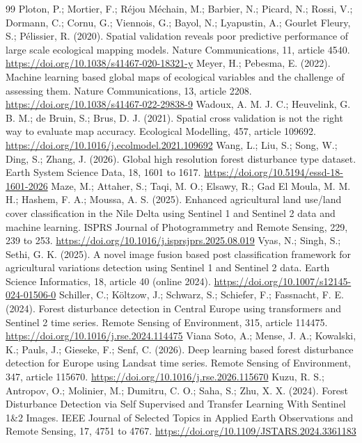 \documentclass[11pt,a4paper]{article}
\begin{document}
\begin{thebibliography}{99}
 Ploton, P.; Mortier, F.; Réjou Méchain, M.; Barbier, N.; Picard, N.; Rossi, V.; Dormann, C.; Cornu, G.; Viennois, G.; Bayol, N.; Lyapustin, A.; Gourlet Fleury, S.; Pélissier, R. (2020). Spatial validation reveals poor predictive performance of large scale ecological mapping models. Nature Communications, 11, article 4540. \url{https://doi.org/10.1038/s41467-020-18321-y}
 Meyer, H.; Pebesma, E. (2022). Machine learning based global maps of ecological variables and the challenge of assessing them. Nature Communications, 13, article 2208. \url{https://doi.org/10.1038/s41467-022-29838-9}
 Wadoux, A. M. J. C.; Heuvelink, G. B. M.; de Bruin, S.; Brus, D. J. (2021). Spatial cross validation is not the right way to evaluate map accuracy. Ecological Modelling, 457, article 109692. \url{https://doi.org/10.1016/j.ecolmodel.2021.109692}
 Wang, L.; Liu, S.; Song, W.; Ding, S.; Zhang, J. (2026). Global high resolution forest disturbance type dataset. Earth System Science Data, 18, 1601 to 1617. \url{https://doi.org/10.5194/essd-18-1601-2026}
 Maze, M.; Attaher, S.; Taqi, M. O.; Elsawy, R.; Gad El Moula, M. M. H.; Hashem, F. A.; Moussa, A. S. (2025). Enhanced agricultural land use/land cover classification in the Nile Delta using Sentinel 1 and Sentinel 2 data and machine learning. ISPRS Journal of Photogrammetry and Remote Sensing, 229, 239 to 253. \url{https://doi.org/10.1016/j.isprsjprs.2025.08.019}
 Vyas, N.; Singh, S.; Sethi, G. K. (2025). A novel image fusion based post classification framework for agricultural variations detection using Sentinel 1 and Sentinel 2 data. Earth Science Informatics, 18, article 40 (online 2024). \url{https://doi.org/10.1007/s12145-024-01506-0}
 Schiller, C.; Költzow, J.; Schwarz, S.; Schiefer, F.; Fassnacht, F. E. (2024). Forest disturbance detection in Central Europe using transformers and Sentinel 2 time series. Remote Sensing of Environment, 315, article 114475. \url{https://doi.org/10.1016/j.rse.2024.114475}
 Viana Soto, A.; Mense, J. A.; Kowalski, K.; Pauls, J.; Gieseke, F.; Senf, C. (2026). Deep learning based forest disturbance detection for Europe using Landsat time series. Remote Sensing of Environment, 347, article 115670. \url{https://doi.org/10.1016/j.rse.2026.115670}
 Kuzu, R. S.; Antropov, O.; Molinier, M.; Dumitru, C. O.; Saha, S.; Zhu, X. X. (2024). Forest Disturbance Detection via Self Supervised and Transfer Learning With Sentinel 1\&2 Images. IEEE Journal of Selected Topics in Applied Earth Observations and Remote Sensing, 17, 4751 to 4767. \url{https://doi.org/10.1109/JSTARS.2024.3361183}

\end{thebibliography}
\end{document}
